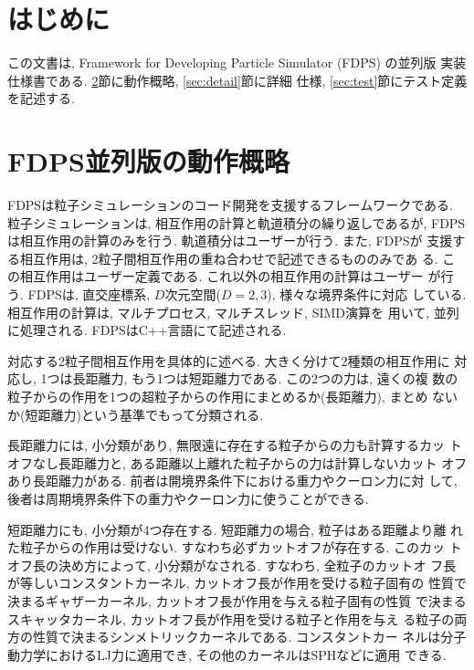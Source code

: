 \documentclass[12pt,a4paper]{jarticle}
\begin{document}
\newpage

\section{はじめに}
\label{sec:at_first}

この文書は, Framework for Developing Particle Simulator (FDPS) の並列版
実装仕様書である. \ref{sec:brief}節に動作概略, \ref{sec:detail}節に詳細
仕様, \ref{sec:test}節にテスト定義を記述する.

\newpage

\section{FDPS並列版の動作概略}
\label{sec:brief}

FDPSは粒子シミュレーションのコード開発を支援するフレームワークである.
粒子シミュレーションは, 相互作用の計算と軌道積分の繰り返しであるが,
FDPSは相互作用の計算のみを行う. 軌道積分はユーザーが行う. また, FDPSが
支援する相互作用は, 2粒子間相互作用の重ね合わせで記述できるもののみであ
る. この相互作用はユーザー定義である. これ以外の相互作用の計算はユーザー
が行う. FDPSは, 直交座標系, $D$次元空間($D=2,3$), 様々な境界条件に対応
している. 相互作用の計算は, マルチプロセス, マルチスレッド, SIMD演算を
用いて, 並列に処理される. FDPSはC++言語にて記述される.

対応する2粒子間相互作用を具体的に述べる. 大きく分けて2種類の相互作用に
対応し, 1つは長距離力, もう1つは短距離力である. この2つの力は, 遠くの複
数の粒子からの作用を1つの超粒子からの作用にまとめるか(長距離力), まとめ
ないか(短距離力)という基準でもって分類される. 

長距離力には, 小分類があり, 無限遠に存在する粒子からの力も計算するカッ
トオフなし長距離力と, ある距離以上離れた粒子からの力は計算しないカット
オフあり長距離力がある.  前者は開境界条件下における重力やクーロン力に対
して, 後者は周期境界条件下の重力やクーロン力に使うことができる. 

短距離力にも, 小分類が4つ存在する. 短距離力の場合, 粒子はある距離より離
れた粒子からの作用は受けない. すなわち必ずカットオフが存在する. このカッ
トオフ長の決め方によって, 小分類がなされる. すなわち, 全粒子のカットオ
フ長が等しいコンスタントカーネル, カットオフ長が作用を受ける粒子固有の
性質で決まるギャザーカーネル, カットオフ長が作用を与える粒子固有の性質
で決まるスキャッタカーネル, カットオフ長が作用を受ける粒子と作用を与え
る粒子の両方の性質で決まるシンメトリックカーネルである. コンスタントカー
ネルは分子動力学におけるLJ力に適用でき, その他のカーネルはSPHなどに適用
できる.
\end{document}
